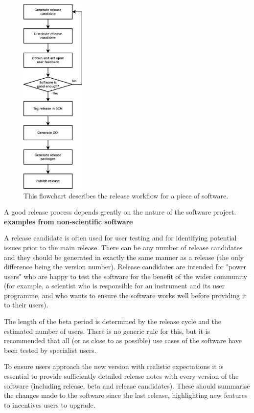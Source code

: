 \documentclass[jnr]{iosart2x}
\newcommand{\todo}[1]{\textbf{#1}}
\begin{document}
\begin{figure}
    \centering
    \includegraphics[height=10cm]{release_workflow.eps}
    \caption{This flowchart describes the release workflow for a piece of software.}
    \label{Release_Flowchart}
\end{figure}

A good release process depends greatly on the nature of the software project.
\todo{examples from non-scientific software}

A release candidate is often used for user testing and for identifying potential issues prior to the main release.
There can be any number of release candidates and they should be generated in exactly the same manner as a release (the only difference being the version number).
Release candidates are intended for "power users" who are happy to test the software for the benefit of the wider community (for example, a scientist who is responsible for an instrument and its user programme, and who wants to ensure the software works well before providing it to their users).

The length of the beta period is determined by the release cycle and the estimated number of users.
There is no generic rule for this, but it is recommended that all (or as close to as possible) use cases of the software have been tested by specialist users.

To ensure users approach the new version with realistic expectations it is essential to provide sufficiently detailed release notes with every version of the software (including release, beta and release candidates).
These should summarise the changes made to the software since the last release, highlighting new features to incentives users to upgrade.
\end{document}
